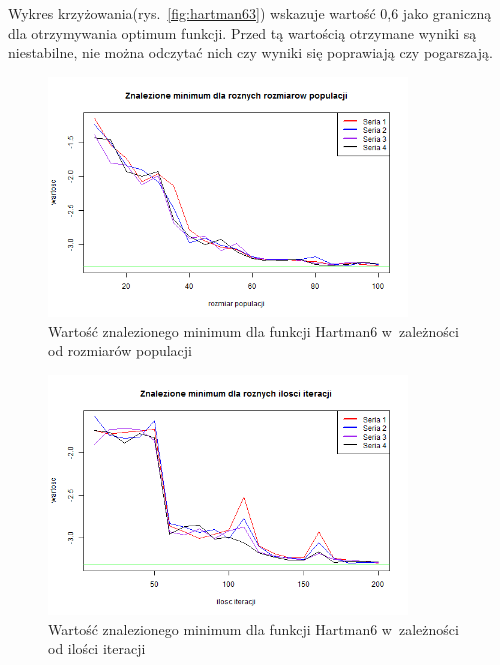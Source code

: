 \documentclass[11pt, a4paper]{article}
\newcommand{\fbi}{\leavevmode{\parindent=1em\indent}}
\begin{document}
\fbi
Wykres krzyżowania(rys.~\ref{fig:hartman63}) wskazuje wartość 0,6 jako graniczną dla otrzymywania optimum funkcji. Przed tą wartością otrzymane wyniki są niestabilne, nie można odczytać nich czy wyniki się poprawiają czy pogarszają.

\begin{figure}[H]
	\begin{center}
		\includegraphics[width=0.85\textwidth]{./assets/Hartman64.png}
		\caption{Wartość znalezionego minimum dla funkcji Hartman6 w~zależności od rozmiarów populacji}
		\label{fig:hartman64}
	\end{center}
\end{figure}


\begin{figure}[H]
	\begin{center}
		\includegraphics[width=0.85\textwidth]{./assets/Hartman65.png}
		\caption{Wartość znalezionego minimum dla funkcji Hartman6 w~zależności od ilości iteracji}
		\label{fig:hartman65}
	\end{center}
\end{figure}
\end{document}

